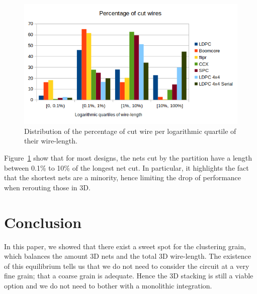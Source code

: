 \documentclass[conference]{IEEEtran}
\begin{document}



\begin{figure}[!t]
\centering
\includegraphics[width=\linewidth]{netCutWL_maxcut_all_log-quart.png}
\caption{Distribution of the percentage of cut wire per logarithmic quartile of their wire-length.}
\label{fig:dits-wl-quart}
\end{figure}

Figure~\ref{fig:dits-wl-quart} show that for most designs, the nets cut by the partition have a length between 0.1\% to 10\% of the longest net cut.
In particular, it highlights the fact that the shortest nets are a minority, hence limiting the drop of performance when rerouting those in 3D.




\newpage
\section{Conclusion}
In this paper, we showed that there exist a sweet spot for the clustering grain, which balances the amount 3D nets and the total 3D wire-length.
The existence of this equilibrium tells us that we do not need to consider the circuit at a very fine grain; that a coarse grain is adequate.
Hence the 3D stacking is still a viable option and we do not need to bother with a monolithic integration.
\end{document}
